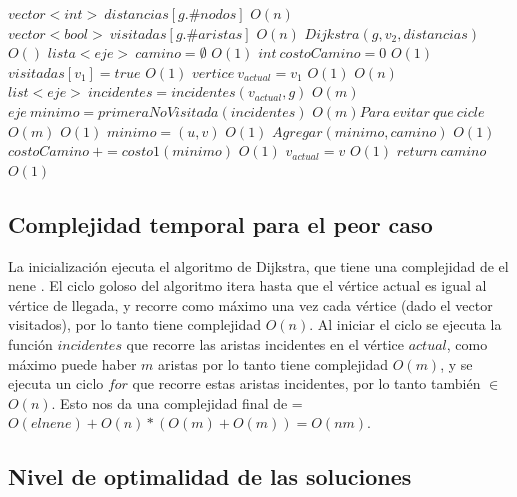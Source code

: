 \begin{algorithmic}


\State $vector<int> \: distancias[g.\#nodos]$
\Comment $ O(n) $
\State $vector<bool> \: visitadas[g.\#aristas]$
\Comment $ O(n) $
\State $ Dijkstra( g, v_2, distancias) $
\Comment $ O() $
\State $lista<eje> \: camino= \emptyset$
\Comment $ O(1) $
\State $ int \: costoCamino = 0 $
\Comment $ O(1) $
\State $ visitadas[v_1] = true $
\Comment $ O(1) $
\State $ vertice \: v_{actual} = v_1 $
\Comment $ O(1) $
\Comment $ O(n) $
	\State $ list<eje> \: incidentes = incidentes(v_{actual}, g) $
	\Comment $ O(m) $
	\State $ eje \:	 minimo = primeraNoVisitada(incidentes) $
	\Comment $ O(m) Para\: evitar \:que \:cicle $
	\Comment $ O(m) $
		\Comment $ O(1) $
			\State $ minimo = (u,v) $
			\Comment $ O(1) $
		\EndIf
	\EndFor
	\State $ Agregar(minimo, camino) $
	\Comment $ O(1) $
	\State $ costoCamino \: += costo1(minimo) $
	\Comment $ O(1) $
	\State $ v_{actual} = v $
	\Comment $ O(1) $
\EndWhile
\State $ return \: camino $
\Comment $ O(1) $

\EndProcedure

\end{algorithmic}
\subsection{Complejidad temporal para el peor caso}

La inicializaci\'on ejecuta el algoritmo de Dijkstra, que tiene una complejidad de el nene . El ciclo goloso del algoritmo itera hasta que el v\'ertice actual es igual al v\'ertice de llegada, y recorre como m\'aximo una vez cada v\'ertice (dado el vector visitados), por lo tanto tiene complejidad $O(n)$. Al iniciar el ciclo se ejecuta la funci\'on $incidentes$ que recorre las aristas incidentes en el v\'ertice $actual$, como m\'aximo puede haber $m$ aristas por lo tanto tiene complejidad $O(m)$, y se ejecuta un ciclo $for$ que recorre estas aristas incidentes, por lo tanto tambi\'en $\in$ $O(n)$. Esto nos da una complejidad final de = $ O(el nene)+ O(n)*(O(m)+O(m)) = O(nm)$. 

\subsection{Nivel de optimalidad de las soluciones}

